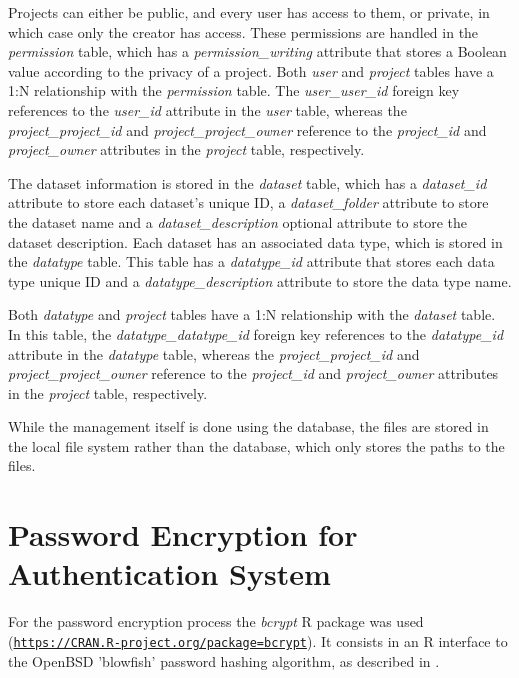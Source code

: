 Projects can either be public, and every user has access to them, or private, in which case only the creator has access. These permissions are handled in the \textit{permission} table, which has a \textit{permission\_writing} attribute that stores a Boolean value according to the privacy of a project. Both \textit{user} and \textit{project} tables have a 1:N relationship with the \textit{permission} table. The \textit{user\_user\_id} foreign key references to the \textit{user\_id} attribute in the \textit{user} table, whereas the \textit{project\_project\_id} and \textit{project\_project\_owner} reference to the \textit{project\_id} and \textit{project\_owner} attributes in the \textit{project} table, respectively.

The dataset information is stored in the \textit{dataset} table, which has a \textit{dataset\_id} attribute to store each dataset's unique ID, a \textit{dataset\_folder} attribute to store the dataset name and a \textit{dataset\_description} optional attribute to store the dataset description. Each dataset has an associated data type, which is stored in the \textit{datatype} table. This table has a \textit{datatype\_id} attribute that stores each data type unique ID and a \textit{datatype\_description} attribute to store the data type name. 

Both \textit{datatype} and \textit{project} tables have a 1:N relationship with the \textit{dataset} table. In this table, the \textit{datatype\_datatype\_id} foreign key references to the \textit{datatype\_id} attribute in the \textit{datatype} table, whereas the \textit{project\_project\_id} and \textit{project\_project\_owner} reference to the \textit{project\_id} and \textit{project\_owner} attributes in the \textit{project} table, respectively.

While the management itself is done using the database, the files are stored in the local file system rather than the database, which only stores the paths to the files.


\section{Password Encryption for Authentication System} \label{password}

For the password encryption process the \textit{bcrypt} R package was used (\href{https://CRAN.R-project.org/package=bcrypt}{\nolinkurl{https://CRAN.R-project.org/package=bcrypt}}). It consists in an R  interface to the OpenBSD 'blowfish' password hashing algorithm, as described in \cite{provos1999future}.

